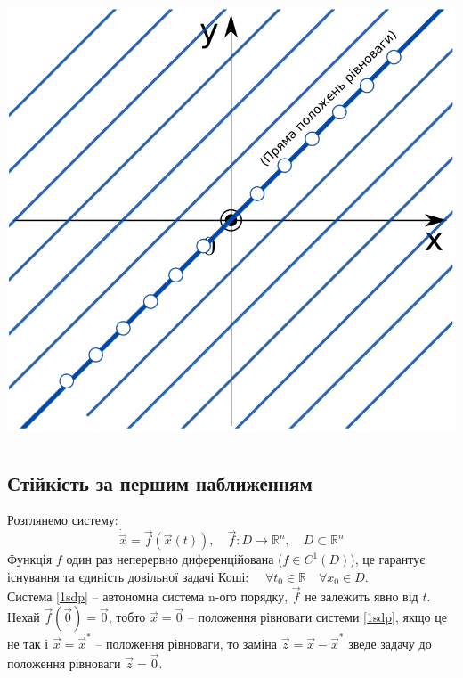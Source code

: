 \documentclass[14pt,a4paper]{scrartcl}
\theoremstyle{definition}
\theoremstyle{definition}
\theoremstyle{definition}
\newcommand*{\vect}[1]{\overrightarrow{\ensuremath{#1}}}
\begin{document}
\begin{center} \includegraphics[scale=0.3]{assets/lectures_recent-49093f01.png} \end{center}

\section{}
\subsection{Стійкість за першим наближенням}

Розглянемо систему:
\begin{equation}\label{1sdp}
  \dot{\vect{x}} = \overrightarrow{f}(\overrightarrow{x}(t)), \quad \overrightarrow{f}: D \rightarrow \mathbb{R}^n, \quad D \subset \mathbb{R}^n
\end{equation}
Функція $f$ один раз неперервно диференційована ($f \in C^1(D)$), це гарантує існування та єдиність довільної задачі Коші: $\quad \forall t_0 \in \mathbb{R} \quad \forall x_0 \in D$. \\
Система \eqref{1sdp} -- автономна система n-ого порядку, $\overrightarrow{f}$ не залежить явно від $t$.
Нехай $\overrightarrow{f}(\overrightarrow{0}) = \overrightarrow{0}$, тобто $\overrightarrow{x} = \overrightarrow{0}$ -- положення рівноваги системи \eqref{1sdp}, якщо це не так і $\overrightarrow{x} = \overrightarrow{x}^*$ -- положення рівноваги, то заміна $\overrightarrow{z} = \overrightarrow{x} - \overrightarrow{x}^*$ зведе задачу до положення рівноваги $\overrightarrow{z} = \overrightarrow{0}$.
\end{document}

